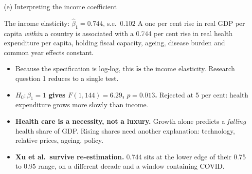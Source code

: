 \documentclass[10pt,aspectratio=169,t]{beamer}
\begin{document}
\begin{frame}{(e) Interpreting the income coefficient}
\vspace{0.5em}
\begin{block}{The income elasticity: $\hat\beta_1 = 0.744$, s.e.\ $0.102$}
A one per cent rise in real GDP per capita \emph{within} a country is associated
with a \alert{0.744 per cent} rise in real health expenditure per capita,
holding fiscal capacity, ageing, disease burden and common year effects
constant.
\end{block}

\vspace{1em}
\begin{itemize}\setlength\itemsep{0.75em}
  \item Because the specification is log-log, this \textbf{is} the income
        elasticity. Research question 1 reduces to a single test.
  \item \textbf{$H_0 : \beta_1 = 1$ gives $F(1,144) = 6.29$, $p = 0.013$.}
        Rejected at 5 per cent: health expenditure grows \alert{more slowly}
        than income.
  \item \textbf{Health care is a necessity, not a luxury.} Growth alone predicts
        a \emph{falling} health share of GDP. Rising shares need another
        explanation: technology, relative prices, ageing, policy.
  \item \textbf{Xu et al.\ survive re-estimation.} 0.744 sits at the lower edge
        of their 0.75 to 0.95 range, on a different decade and a window
        containing COVID.
\end{itemize}
\end{frame}
\end{document}
